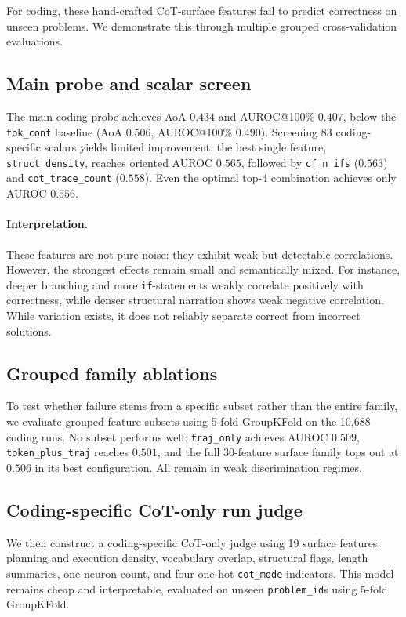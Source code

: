 \documentclass[10pt,twocolumn]{article}
\begin{document}
For coding, these hand-crafted CoT-surface features fail to predict correctness on unseen problems. We demonstrate this through multiple grouped cross-validation evaluations.

\subsection{Main probe and scalar screen}

The main coding probe achieves AoA $0.434$ and AUROC@100\% $0.407$, below the \texttt{tok\_conf} baseline (AoA $0.506$, AUROC@100\% $0.490$). Screening 83 coding-specific scalars yields limited improvement: the best single feature, \texttt{struct\_density}, reaches oriented AUROC $0.565$, followed by \texttt{cf\_n\_ifs} ($0.563$) and \texttt{cot\_trace\_count} ($0.558$). Even the optimal top-4 combination achieves only AUROC $0.556$.

\paragraph{Interpretation.}
These features are not pure noise: they exhibit weak but detectable correlations. However, the strongest effects remain small and semantically mixed. For instance, deeper branching and more \texttt{if}-statements weakly correlate positively with correctness, while denser structural narration shows weak negative correlation. While variation exists, it does not reliably separate correct from incorrect solutions.

\subsection{Grouped family ablations}

To test whether failure stems from a specific subset rather than the entire family, we evaluate grouped feature subsets using 5-fold GroupKFold on the 10,688 coding runs. No subset performs well: \texttt{traj\_only} achieves AUROC $0.509$, \texttt{token\_plus\_traj} reaches $0.501$, and the full 30-feature surface family tops out at $0.506$ in its best configuration. All remain in weak discrimination regimes.

\subsection{Coding-specific CoT-only run judge}

We then construct a coding-specific CoT-only judge using 19 surface features: planning and execution density, vocabulary overlap, structural flags, length summaries, one neuron count, and four one-hot \texttt{cot\_mode} indicators. This model remains cheap and interpretable, evaluated on unseen \texttt{problem\_id}s using 5-fold GroupKFold.
\end{document}
